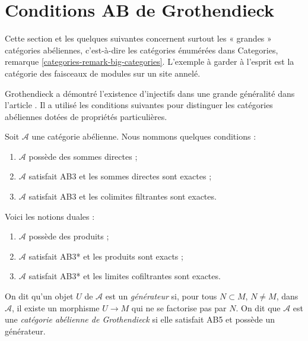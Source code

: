 \section{Conditions AB de Grothendieck}
\label{section-grothendieck-conditions}

\noindent
Cette section et les quelques suivantes concernent surtout les « grandes »
catégories abéliennes, c'est-à-dire les catégories énumérées dans
Categories, remarque \ref{categories-remark-big-categories}. L'exemple à
garder à l'esprit est la catégorie des faisceaux de modules sur un site annelé.

\medskip\noindent
Grothendieck a démontré l'existence d'injectifs dans une grande généralité dans
l'article \cite{Tohoku}. Il a utilisé les conditions suivantes pour distinguer
les catégories abéliennes dotées de propriétés particulières.

\begin{definition}
\label{definition-grothendieck-conditions}
Soit $\mathcal{A}$ une catégorie abélienne. Nous nommons quelques conditions :
\begin{enumerate}
\item[AB3] $\mathcal{A}$ possède des sommes directes ;
\item[AB4] $\mathcal{A}$ satisfait AB3 et les sommes directes sont exactes ;
\item[AB5] $\mathcal{A}$ satisfait AB3 et les colimites filtrantes sont
exactes.
\end{enumerate}
Voici les notions duales :
\begin{enumerate}
\item[AB3*] $\mathcal{A}$ possède des produits ;
\item[AB4*] $\mathcal{A}$ satisfait AB3* et les produits sont exacts ;
\item[AB5*] $\mathcal{A}$ satisfait AB3* et les limites cofiltrantes sont
exactes.
\end{enumerate}
On dit qu'un objet $U$ de $\mathcal{A}$ est un {\it générateur} si, pour tous
$N \subset M$, $N \not = M$, dans $\mathcal{A}$, il existe un morphisme
$U \to M$ qui ne se factorise pas par $N$. On dit que $\mathcal{A}$ est une
{\it catégorie abélienne de Grothendieck} si elle satisfait AB5 et possède un
générateur.
\end{definition}

